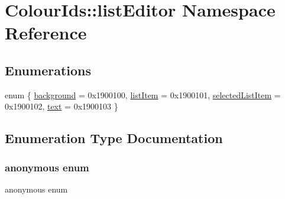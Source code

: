 \hypertarget{namespaceColourIds_1_1listEditor}{}\section{Colour\+Ids\+:\+:list\+Editor Namespace Reference}
\label{namespaceColourIds_1_1listEditor}
\subsection*{Enumerations}
\begin{DoxyCompactItemize}
\item 
enum \{ \mbox{\hyperlink{namespaceColourIds_1_1listEditor_a8069ad17679488f66cbf78342ac4606aaaef594dcc74d73f759fae3985e13dfcc}{background}} = 0x1900100, 
\mbox{\hyperlink{namespaceColourIds_1_1listEditor_a8069ad17679488f66cbf78342ac4606aa421ed577205acfea0986a10b7e4b3e02}{list\+Item}} = 0x1900101, 
\mbox{\hyperlink{namespaceColourIds_1_1listEditor_a8069ad17679488f66cbf78342ac4606aa515d8e369eefb12a88701c3a789a07ec}{selected\+List\+Item}} = 0x1900102, 
\mbox{\hyperlink{namespaceColourIds_1_1listEditor_a8069ad17679488f66cbf78342ac4606aa90219d3c8374ee348ceb1d08b1f7cd87}{text}} = 0x1900103
 \}
\end{DoxyCompactItemize}


\subsection{Enumeration Type Documentation}
\mbox{\label{namespaceColourIds_1_1listEditor_a8069ad17679488f66cbf78342ac4606a}} 
\subsubsection{\texorpdfstring{anonymous enum}{anonymous enum}}
{\footnotesize\ttfamily anonymous enum}

